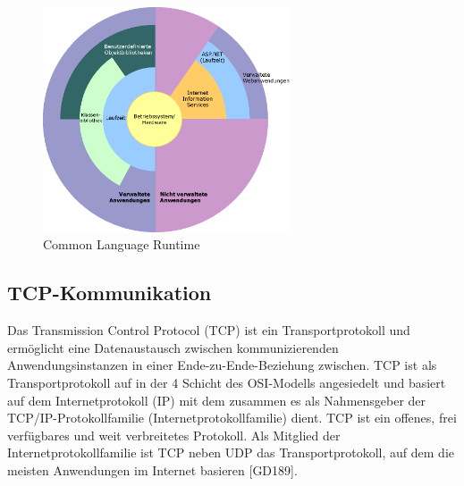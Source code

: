 \begin{figure}[h]
	\centering
	\includegraphics[width=0.65\textwidth]{images/technische_grundlagen/clr.png}
	\caption{Common Language Runtime \cite{Microsoft.Overviewof}}
	\label{fig:clr}
\end{figure}

\color{process}

\subsection{TCP-Kommunikation}
Das Transmission Control Protocol (TCP) ist ein Transportprotokoll und ermöglicht eine Datenaustausch zwischen kommunizierenden Anwendungsinstanzen in einer Ende-zu-Ende-Beziehung zwischen. TCP ist als Transportprotokoll auf in der 4 Schicht des OSI-Modells angesiedelt und basiert auf dem Internetprotokoll (IP) mit dem zusammen es als Nahmensgeber der TCP/IP-Protokollfamilie (Internetprotokollfamilie) dient.
TCP ist ein offenes, frei verfügbares und weit verbreitetes Protokoll. Als Mitglied der Internetprotokollfamilie ist TCP neben UDP das Transportprotokoll, auf dem die meisten Anwendungen im Internet basieren [GD189].
